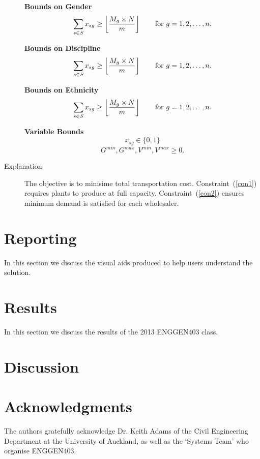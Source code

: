 \documentclass[12pt]{ORSNZ}
\begin{document}
\begin{description}
\textbf{Bounds on Gender}
\begin{equation} \label{con2}
\sum_{s \in S} x_{sg} \geq \left\lfloor\frac{M_g\times N}{m}\right\rfloor \qquad \mbox{for $ g = 1, 2, \ldots, n$.}
\end{equation}

\textbf{Bounds on Discipline}
\begin{equation} \label{con2}
\sum_{s \in S} x_{sg} \geq \left\lfloor\frac{M_g\times N}{m}\right\rfloor \qquad \mbox{for $ g = 1, 2, \ldots, n$.}
\end{equation}

\textbf{Bounds on Ethnicity}
\begin{equation} \label{con2}
\sum_{s \in S} x_{sg} \geq \left\lfloor\frac{M_g\times N}{m}\right\rfloor \qquad \mbox{for $ g = 1, 2, \ldots, n$.}
\end{equation}

\textbf{Variable Bounds}
\[x_{sg} \in \{0, 1\}\]
\[G^{min}, G^{max}, V^{min}, V^{max} \ge 0.\]

\item[Explanation] The objective is to minisime total transportation
cost. Constraint~(\ref{con1}) requires plants to produce at full
capacity. Constraint~(\ref{con2}) ensures minimum demand is satisfied
for each wholesaler.
\end{description}

\section{Reporting}
	In this section we discuss the visual aids produced to help users understand the solution.

\section{Results}
	In this section we discuss the results of the 2013 ENGGEN403 class.
	
\section{Discussion}


\section*{Acknowledgments}
The authors gratefully acknowledge Dr. Keith Adams of the Civil Engineering Department at the University of Auckland, as well as the `Systems Team' who organise ENGGEN403.



\end{document}
